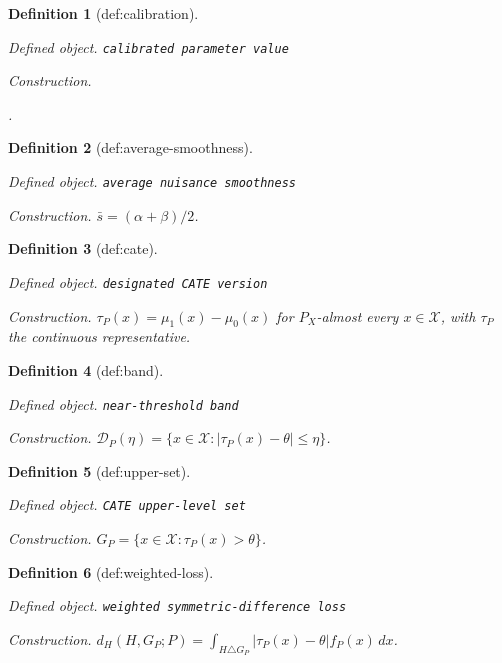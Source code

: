 \documentclass{article}
\newtheorem{definition}{Definition}
\begin{document}
\begin{definition}[def:calibration]\label{def:calibration}
\par\smallskip\noindent\emph{Defined object.} \texttt{calibrated parameter value}
\par\smallskip\noindent\emph{Construction.} \leavevmode\par\noindent {}\par\noindent.
\end{definition}

\begin{definition}[def:average-smoothness]\label{def:average-smoothness}
\par\smallskip\noindent\emph{Defined object.} \texttt{average nuisance smoothness}
\par\smallskip\noindent\emph{Construction.} \(\bar s=(\alpha+\beta)/2\).
\end{definition}

\begin{definition}[def:cate]\label{def:cate}
\par\smallskip\noindent\emph{Defined object.} \texttt{designated CATE version}
\par\smallskip\noindent\emph{Construction.} \(\tau_P(x)=\mu_1(x)-\mu_0(x)\) for \(P_X\)-almost every \(x\in\mathcal X\), with \(\tau_P\) the continuous representative.
\end{definition}

\begin{definition}[def:band]\label{def:band}
\par\smallskip\noindent\emph{Defined object.} \texttt{near-\allowbreak{}threshold band}
\par\smallskip\noindent\emph{Construction.} \(\mathcal D_P(\eta)=\{x\in\mathcal X:|\tau_P(x)-\theta|\le\eta\}\).
\end{definition}

\begin{definition}[def:upper-set]\label{def:upper-set}
\par\smallskip\noindent\emph{Defined object.} \texttt{CATE upper-\allowbreak{}level set}
\par\smallskip\noindent\emph{Construction.} \(G_P=\{x\in\mathcal X:\tau_P(x)>\theta\}\).
\end{definition}

\begin{definition}[def:weighted-loss]\label{def:weighted-loss}
\par\smallskip\noindent\emph{Defined object.} \texttt{weighted symmetric-\allowbreak{}difference loss}
\par\smallskip\noindent\emph{Construction.} \(d_H(H,G_P;P)=\int_{H\triangle G_P}|\tau_P(x)-\theta|f_P(x)\,dx\).
\end{definition}
\end{document}
